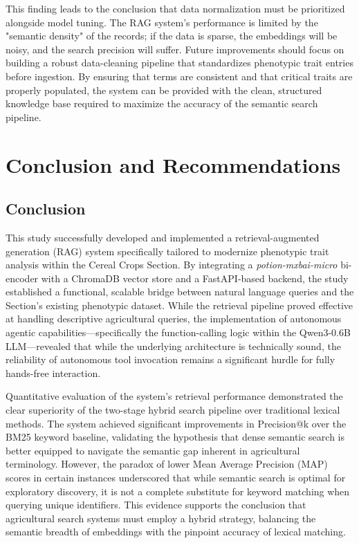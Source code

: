 \documentclass[journal]{./IEEE/IEEEtran}
\begin{document}
This finding leads to the conclusion that data normalization must be prioritized alongside model tuning. The RAG system’s performance is limited by the "semantic density" of the records; if the data is sparse, the embeddings will be noisy, and the search precision will suffer. Future improvements should focus on building a robust data-cleaning pipeline that standardizes phenotypic trait entries before ingestion. By ensuring that terms are consistent and that critical traits are properly populated, the system can be provided with the clean, structured knowledge base required to maximize the accuracy of the semantic search pipeline.

\section{Conclusion and Recommendations}

\subsection{Conclusion}
This study successfully developed and implemented a retrieval-augmented generation (RAG) system specifically tailored to modernize phenotypic trait analysis within the Cereal Crops Section. By integrating a \textit{potion-mxbai-micro} bi-encoder with a ChromaDB vector store and a FastAPI-based backend, the study established a functional, scalable bridge between natural language queries and the Section's existing phenotypic dataset. While the retrieval pipeline proved effective at handling descriptive agricultural queries, the implementation of autonomous agentic capabilities—specifically the function-calling logic within the Qwen3-0.6B LLM—revealed that while the underlying architecture is technically sound, the reliability of autonomous tool invocation remains a significant hurdle for fully hands-free interaction.

Quantitative evaluation of the system’s retrieval performance demonstrated the clear superiority of the two-stage hybrid search pipeline over traditional lexical methods. The system achieved significant improvements in Precision@k over the BM25 keyword baseline, validating the hypothesis that dense semantic search is better equipped to navigate the semantic gap inherent in agricultural terminology. However, the paradox of lower Mean Average Precision (MAP) scores in certain instances underscored that while semantic search is optimal for exploratory discovery, it is not a complete substitute for keyword matching when querying unique identifiers. This evidence supports the conclusion that agricultural search systems must employ a hybrid strategy, balancing the semantic breadth of embeddings with the pinpoint accuracy of lexical matching.
\end{document}
